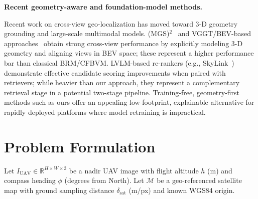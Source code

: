 \documentclass[10pt]{article}
\theoremstyle{plain}
\theoremstyle{definition}
\begin{document}
\noindent\textbf{Recent geometry-aware and foundation-model methods.}
\begin{sloppypar}
Recent work on cross-view geo-localization has moved toward 3-D geometry
grounding and large-scale multimodal models.
(MGS)$^2$~\cite{mgs2_2024} and VGGT/BEV-based approaches~\cite{vggt2024}
obtain strong cross-view performance by explicitly modeling 3-D geometry
and aligning views in BEV space; these represent a higher performance bar
than classical BRM/CFBVM.
LVLM-based re-rankers (e.g., SkyLink~\cite{skylink2024}) demonstrate
effective candidate scoring improvements when paired with retrievers;
while heavier than our approach, they represent a complementary retrieval
stage in a potential two-stage pipeline.
Training-free, geometry-first methods such as ours offer an appealing
low-footprint, explainable alternative for rapidly deployed platforms
where model retraining is impractical.
\end{sloppypar}

\section{Problem Formulation}
\label{sec:problem}

Let $I_{\mathrm{UAV}} \in \mathbb{R}^{H \times W \times 3}$ be a nadir UAV
image with flight altitude $h$ (m) and compass heading $\phi$ (degrees from
North).
Let $\mathcal{M}$ be a geo-referenced satellite map with ground sampling
distance $\delta_{\mathrm{sat}}$ (m/px) and known WGS84 origin.
\end{document}
